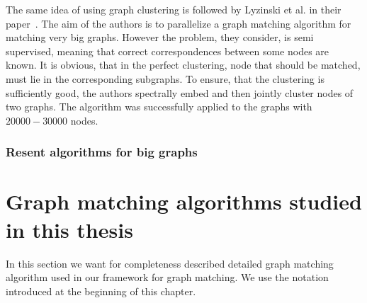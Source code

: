 The same idea of using graph clustering is followed by Lyzinski et al. in their paper~\cite{Lyzinski2015}. The aim of the authors is to parallelize a graph matching algorithm for matching very big graphs. However the problem, they consider, is semi supervised, meaning that correct correspondences between some nodes are known. It is obvious, that in the perfect clustering, node that should be matched, must lie in the corresponding subgraphs. To ensure, that the clustering is sufficiently good, the authors spectrally embed and then jointly cluster nodes of two graphs. The algorithm was successfully applied to the graphs with $20000-30000$ nodes.

\subsubsection{Resent algorithms for big graphs}

\section{Graph matching algorithms studied in this thesis}
In this section we want for completeness described detailed graph matching algorithm used in our framework for graph matching. We use the notation introduced at the beginning of this chapter.

